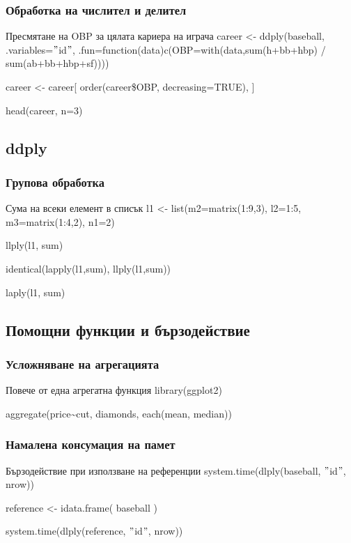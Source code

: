\documentclass{beamer}
\begin{document}
\begin{frame}
\frametitle{Обработка на числител и делител}
\begin{block}{Пресмятане на OBP за цялата кариера на играча}
career <- ddply(baseball, .variables=$"$id$"$, .fun=function(data){c(OBP=with(data,sum(h+bb+hbp) / sum(ab+bb+hbp+sf)))})

career <- career[ order(career\$OBP, decreasing=TRUE), ]

head(career, n=3)
\end{block}
\end{frame}

\subsection{ddply}

\begin{frame}
\frametitle{Групова обработка}
\begin{block}{Сума на всеки елемент в списък}
l1 <- list(m2=matrix(1:9,3), l2=1:5, m3=matrix(1:4,2), n1=2)

llply(l1, sum)

identical(lapply(l1,sum), llply(l1,sum))

laply(l1, sum)
\end{block}
\end{frame}

\subsection{Помощни функции и бързодействие}

\begin{frame}
\frametitle{Усложняване на агрегацията}
\begin{block}{Повече от една агрегатна функция}
library(ggplot2)

aggregate(price\textasciitilde cut, diamonds, each(mean, median))
\end{block}
\end{frame}

\begin{frame}
\frametitle{Намалена консумация на памет}
\begin{block}{Бързодействие при използване на референции}
system.time(dlply(baseball, $"$id$"$, nrow))

reference <- idata.frame( baseball )

system.time(dlply(reference, $"$id$"$, nrow))
\end{block}
\end{frame}
\end{document}
